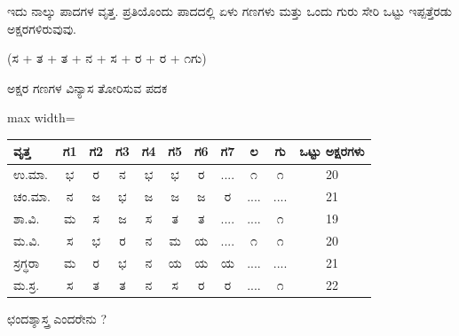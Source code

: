 \vspace{4pt plus 4pt minus 1pt}\hspace{0.5em}ಇದು ನಾಲ್ಕು ಪಾದಗಳ ವೃತ್ತ. ಪ್ರತಿಯೊಂದು ಪಾದದಲ್ಲಿ ಏಳು ಗಣಗಳು ಮತ್ತು ಒಂದು ಗುರು ಸೇರಿ ಒಟ್ಟು ಇಪ್ಪತ್ತೆರಡು ಅಕ್ಷರಗಳಿರುವುವು.\par

\begin{kbvnote}
\hspace{0.5em}(ಸ + ತ + ತ + ನ + ಸ + ರ + ರ + ೧ಗು)
\end{kbvnote}

\vspace{6pt plus 5pt minus 1pt}\begin{center}{\kbvsecfont\fontsize{12.5pt}{16pt}\selectfont\color{kbvaccentdark} ಅಕ್ಷರ ಗಣಗಳ ವಿನ್ಯಾಸ ತೋರಿಸುವ ಪದಕ}\end{center}\vspace{3pt plus 3pt minus 1pt}

\vspace{5pt plus 4pt minus 1pt}
\noindent\begin{adjustbox}{max width=\textwidth}
{\renewcommand{\arraystretch}{1.30}\setlength{\tabcolsep}{4.5pt}
\begin{tabular}{l c c c c c c c c c c}
\toprule
\textbf{ವೃತ್ತ} & \textbf{ಗ1} & \textbf{ಗ2} & \textbf{ಗ3} & \textbf{ಗ4} & \textbf{ಗ5} & \textbf{ಗ6} & \textbf{ಗ7} & \textbf{ಲ} & \textbf{ಗು} & \textbf{ಒಟ್ಟು ಅಕ್ಷರಗಳು} \\
\midrule
ಉ.ಮಾ. & ಭ & ರ & ನ & ಭ & ಭ & ರ & .... & ೧ & ೧ & 20 \\
\hline
ಚಂ.ಮಾ. & ನ & ಜ & ಭ & ಜ & ಜ & ಜ & ರ & .... & .... & 21 \\
\hline
ಶಾ.ವಿ. & ಮ & ಸ & ಜ & ಸ & ತ & ತ & .... & .... & ೧ & 19 \\
\hline
ಮ.ವಿ. & ಸ & ಭ & ರ & ನ & ಮ & ಯ & .... & ೧ & ೧ & 20 \\
\hline
ಸ್ರಗ್ಧರಾ & ಮ & ರ & ಭ & ನ & ಯ & ಯ & ಯ & .... & .... & 21 \\
\hline
ಮ.ಸ್ರ. & ಸ & ತ & ತ & ನ & ಸ & ರ & ರ & .... & ೧ & 22 \\
\bottomrule
\end{tabular}}
\end{adjustbox}
\vspace{6pt plus 4pt minus 1pt}


\vspace{2.5pt plus 3pt minus 0.5pt}\noindent\hspace*{1.2em}\hspace{0.55em}ಛಂದಶ್ಶಾಸ್ತ್ರ ಎಂದರೇನು ?\par

